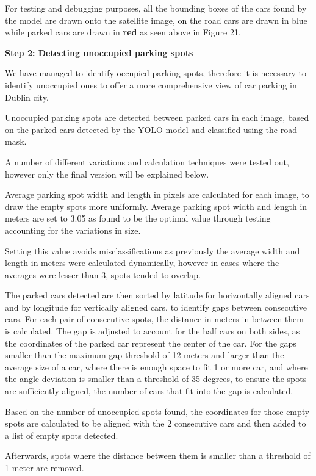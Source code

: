 For testing and debugging purposes, all the bounding boxes of the cars found by
the model are drawn onto the satellite image, on the road cars are drawn in blue
while parked cars are drawn in \textbf{red} as seen above in
Figure 21.

\newpage{}

\textbf{Step 2: Detecting unoccupied parking spots}

We have managed to identify occupied parking spots, therefore it is necessary to
identify unoccupied ones to offer a more comprehensive view of car parking in
Dublin city.

Unoccupied parking spots are detected between parked cars in each image, based on the
parked cars detected by the YOLO model and classified using the road mask.

A number of different variations and calculation techniques were tested out,
however only the final version will be explained below.

Average parking spot width and length in pixels are calculated for each image,
to draw the empty spots more uniformly. Average parking spot width and length in
meters are set to 3.05 as found to be the optimal value through testing
accounting for the variations in size.

Setting this value avoids misclassifications as previously the average width and
length in meters were calculated dynamically, however in cases where the
averages were lesser than 3, spots tended to overlap.

The parked cars detected are then sorted by latitude for horizontally aligned
cars and by longitude for vertically aligned cars, to identify gaps between
consecutive cars. For each pair of consecutive spots, the distance in meters in
between them is calculated. The gap is adjusted to account for the half cars on
both sides, as the coordinates of the parked car represent the center of the
car. For the gaps smaller than the maximum gap threshold of 12 meters and larger
than the average size of a car, where there is enough space to fit 1 or more
car, and where the angle deviation is smaller than a threshold of 35 degrees, to
ensure the spots are sufficiently aligned, the number of cars that fit into the
gap is calculated.

Based on the number of unoccupied spots found, the coordinates for those empty spots
are calculated to be aligned with the 2 consecutive cars and then added to a
list of empty spots detected.

Afterwards, spots where the distance between them is smaller than a threshold of
1 meter are removed.


